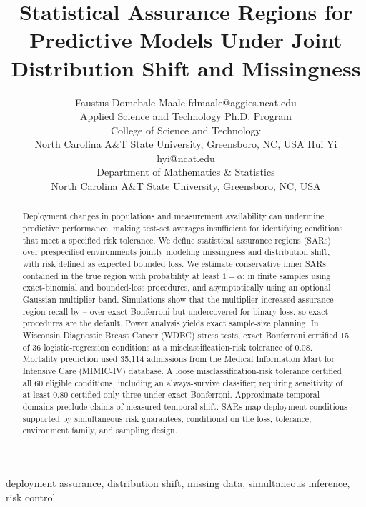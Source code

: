 \documentclass[twoside,11pt]{article}
\begin{document}
\title{Statistical Assurance Regions for Predictive Models Under Joint Distribution Shift and Missingness}

\author{\name Faustus Domebale Maale \email fdmaale@aggies.ncat.edu \\
\addr Applied Science and Technology Ph.D. Program\\
College of Science and Technology\\
North Carolina A\&T State University, Greensboro, NC, USA
\AND
\name Hui Yi \email hyi@ncat.edu \\
\addr Department of Mathematics \& Statistics\\
North Carolina A\&T State University, Greensboro, NC, USA}

\editor{}
\maketitle

\begin{abstract}%
Deployment changes in populations and measurement availability can undermine
predictive performance, making test-set averages insufficient for identifying
conditions that meet a specified risk tolerance. We define statistical
assurance regions (SARs) over prespecified environments jointly modeling
missingness and distribution shift, with risk defined as expected bounded
loss. We estimate conservative inner SARs contained in the true
region with probability at least $1-\alpha$: in finite samples using
exact-binomial and bounded-loss procedures, and asymptotically using an
optional Gaussian multiplier band. Simulations show that the multiplier
increased assurance-region recall by \GainExactMin{}--\GainExactMax{}
over exact Bonferroni but undercovered for binary loss, so exact procedures
are the default. Power analysis yields exact sample-size planning.
In Wisconsin Diagnostic Breast Cancer (WDBC) stress tests, exact Bonferroni
certified 15 of 36 logistic-regression conditions at a misclassification-risk
tolerance of 0.08. Mortality prediction used 35,114 admissions from the
Medical Information Mart for Intensive Care (MIMIC-IV) database.
A loose misclassification-risk tolerance certified all 60 eligible
conditions, including an always-survive classifier; requiring sensitivity
of at least 0.80 certified only three under exact Bonferroni.
Approximate temporal domains preclude claims of measured temporal shift.
SARs map deployment conditions supported by simultaneous risk guarantees,
conditional on the loss, tolerance, environment family, and sampling design.
\end{abstract}
\begin{keywords}
deployment assurance, distribution shift, missing data, simultaneous inference, risk control
\end{keywords}
\end{document}
